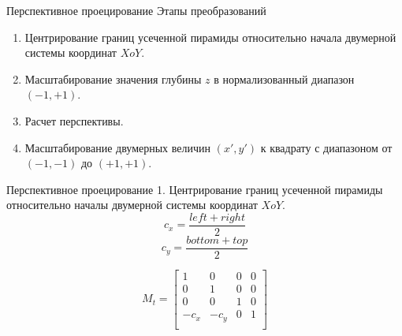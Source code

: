 \documentclass{beamer}
\begin{document}
	\begin{frame}{Перспективное проецирование}
		Этапы преобразований
		\begin{enumerate}
			\item Центрирование границ усеченной пирамиды относительно начала двумерной системы координат $XoY$.
			\item Масштабирование значения глубины $z$ в нормализованный диапазон $(-1, +1)$.
			\item Расчет перспективы.
			\item Масштабирование двумерных величин $(x', y')$ к квадрату с диапазоном от $(-1, -1)$ до $(+1, +1)$.
			\end{enumerate}


		\end{frame}

	\begin{frame}{Перспективное проецирование}
		1. Центрирование границ усеченной пирамиды относительно началы двумерной системы координат $XoY$.
		\[
			c_x = \frac{left + right}{2}
		\]
		\[
			c_y = \frac{bottom + top}{2}
		\]

		\[
			M_t = 
			\begin{bmatrix}
				1 & 0 & 0 & 0 \\
				0 & 1 & 0 & 0 \\
				0 & 0 & 1 & 0 \\
				-c_x & -c_y & 0 & 1 \\
			\end{bmatrix}	
		\]
	\end{frame}
\end{document}
